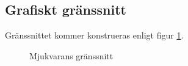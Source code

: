 \documentclass[11pt]{article}
\begin{document}
\begin{flushleft}
\pagebreak
\subsection{Grafiskt gränssnitt}
Gränssnittet kommer konstrueras enligt figur \ref{software}.
\begin{figure}[htbp]
\centering
\noindent\resizebox{.5\textwidth}{!}{
		}
	\caption{Mjukvarans gränssnitt \label{software}}
\end{figure}
%
%
%  
%	
%

\setcounter{secnumdepth}{2}

\end{flushleft}
\end{document}
